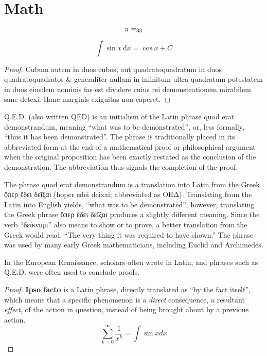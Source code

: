 \documentclass[twoside]{fduthesis-en}
\begin{document}
\section{Math}

\[\pi=\sb{33}\]

\[
  \int\sin x\,\mathrm{d}x=\cos x + C
\]

\begin{proof}
Cubum autem in duos cubos, aut quadratoquadratum in duos quadratoquadratos
\& generaliter nullam in infinitum ultra quadratum potestatem in duos eiusdem
nominis fas est dividere cuius rei demonstrationem mirabilem sane detexi.
Hanc marginis exiguitas non caperet.
\end{proof}

\begin{definition}
Q.E.D. (also written QED) is an initialism of the Latin phrase quod erat
demonstrandum, meaning ``what was to be demonstrated'', or, less formally,
``thus it has been demonstrated''. The phrase is traditionally placed in
its abbreviated form at the end of a mathematical proof or philosophical
argument when the original proposition has been exactly restated as the
conclusion of the demonstration. The abbreviation thus signals the completion
of the proof.

The phrase quod erat demonstrandum is a translation into Latin from the
Greek ὅπερ ἔδει δεῖξαι (hoper edei deixai; abbreviated as ΟΕΔ). Translating
from the Latin into English yields, ``what was to be demonstrated''; however,
translating the Greek phrase ὅπερ ἔδει δεῖξαι produces a slightly different
meaning. Since the verb ``δείκνυμι'' also means to show or to prove, a
better translation from the Greek would read, ``The very thing it was required
to have shown.'' The phrase was used by many early Greek mathematicians,
including Euclid and Archimedes.
\end{definition}

\begin{lemma}
In the European Renaissance, scholars often wrote in Latin, and phrases
such as Q.E.D. were often used to conclude proofs.
\end{lemma}

\begin{proof}
\textbf{Ipso facto} is a Latin phrase, directly translated as ``by the fact itself'',
which means that a specific phenomenon is a \emph{direct} consequence, a
resultant \textit{effect}, of the action in question, instead of being brought
about by a previous action.
\begin{equation}
  \sum_{k=0}^{\infty} \frac{1}{x^k} = \int \sin x dx
\end{equation}
\end{proof}
\end{document}
